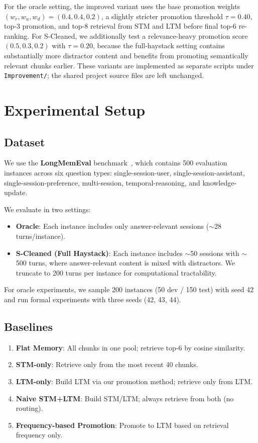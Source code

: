\documentclass{article}
\begin{document}
For the oracle setting, the improved variant uses the base promotion weights $(w_r, w_u, w_d)=(0.4,0.4,0.2)$, a slightly stricter promotion threshold $\tau=0.40$, top-3 promotion, and top-8 retrieval from STM and LTM before final top-6 re-ranking. For S-Cleaned, we additionally test a relevance-heavy promotion score $(0.5,0.3,0.2)$ with $\tau=0.20$, because the full-haystack setting contains substantially more distractor content and benefits from promoting semantically relevant chunks earlier. These variants are implemented as separate scripts under \texttt{Improvement/}; the shared project source files are left unchanged.

\section{Experimental Setup}

\subsection{Dataset}

We use the \textbf{LongMemEval} benchmark~\cite{longmemeval}, which contains 500 evaluation instances across six question types: single-session-user, single-session-assistant, single-session-preference, multi-session, temporal-reasoning, and knowledge-update.

We evaluate in two settings:
\begin{itemize}
    \item \textbf{Oracle}: Each instance includes only answer-relevant sessions ($\sim$28 turns/instance).
    \item \textbf{S-Cleaned (Full Haystack)}: Each instance includes $\sim$50 sessions with $\sim$500 turns, where answer-relevant content is mixed with distractors. We truncate to 200 turns per instance for computational tractability.
\end{itemize}

For oracle experiments, we sample 200 instances (50 dev / 150 test) with seed 42 and run formal experiments with three seeds (42, 43, 44).

\subsection{Baselines}

\begin{enumerate}
    \item \textbf{Flat Memory}: All chunks in one pool; retrieve top-6 by cosine similarity.
    \item \textbf{STM-only}: Retrieve only from the most recent 40 chunks.
    \item \textbf{LTM-only}: Build LTM via our promotion method; retrieve only from LTM.
    \item \textbf{Naive STM+LTM}: Build STM/LTM; always retrieve from both (no routing).
    \item \textbf{Frequency-based Promotion}: Promote to LTM based on retrieval frequency only.
\end{enumerate}
\end{document}
